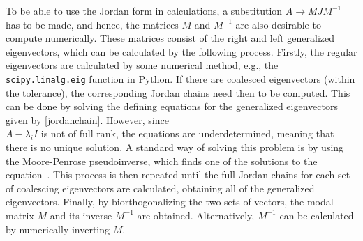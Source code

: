 \documentclass[../main.tex]{subfiles}
\begin{document}
To be able to use the Jordan form in calculations, a substitution $A\rightarrow MJM^{-1}$ has to be made, and hence, the matrices $M$ and $M^{-1}$ are also desirable to compute numerically. These matrices consist of the right and left generalized eigenvectors, which can be calculated by the following process. Firstly, the regular eigenvectors are calculated by some numerical method, e.g., the \verb+scipy.linalg.eig+ function in Python. If there are coalesced eigenvectors (within the tolerance), the corresponding Jordan chains need then to be computed. This can be done by solving the defining equations for the generalized eigenvectors given by \cref{jordanchain}. However, since\\$A-\lambda_iI$ is not of full rank, the equations are underdetermined, meaning that there is no unique solution. A standard way of solving this problem is by using the Moore-Penrose pseudoinverse, which finds one of the solutions to the equation~\cite{uffe}. This process is then repeated until the full Jordan chains for each set of coalescing eigenvectors are calculated, obtaining all of the generalized eigenvectors. Finally, by biorthogonalizing the two sets of vectors, the modal matrix $M$ and its inverse $M^{-1}$ are obtained. Alternatively, $M^{-1}$ can be calculated by numerically inverting $M$. 


\end{document}
